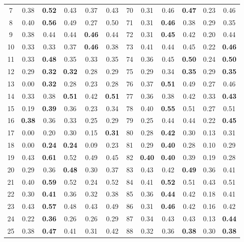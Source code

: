 \documentclass{article}
\begin{document}
{\begin{longtable}{cccccc@{\qquad}cccccc}
7 & 0.38 & \textbf{0.52} & 0.43 & 0.37 & 0.43 & 70 & 0.31 & 0.46 & \textbf{0.47} & 0.23 & 0.46 \\
8 & 0.40 & \textbf{0.56} & 0.49 & 0.27 & 0.50 & 71 & 0.31 & \textbf{0.46} & 0.38 & 0.29 & 0.35 \\
9 & 0.38 & 0.44 & 0.44 & \textbf{0.46} & 0.44 & 72 & 0.31 & \textbf{0.45} & 0.42 & 0.20 & 0.44 \\
10 & 0.33 & 0.33 & 0.37 & \textbf{0.46} & 0.38 & 73 & 0.41 & 0.44 & 0.45 & 0.22 & \textbf{0.46} \\
11 & 0.33 & \textbf{0.48} & 0.35 & 0.33 & 0.35 & 74 & 0.36 & 0.45 & \textbf{0.50} & 0.24 & \textbf{0.50} \\
12 & 0.29 & \textbf{0.32} & \textbf{0.32} & 0.28 & 0.29 & 75 & 0.29 & 0.34 & \textbf{0.35} & 0.29 & \textbf{0.35} \\
13 & 0.00 & \textbf{0.32} & 0.28 & 0.23 & 0.28 & 76 & 0.37 & \textbf{0.51} & 0.49 & 0.27 & 0.46 \\
14 & 0.33 & 0.38 & \textbf{0.51} & 0.42 & \textbf{0.51} & 77 & 0.36 & 0.38 & 0.42 & 0.33 & \textbf{0.43} \\
15 & 0.19 & \textbf{0.39} & 0.36 & 0.23 & 0.34 & 78 & 0.40 & \textbf{0.55} & 0.51 & 0.27 & 0.51 \\
16 & \textbf{0.38} & 0.36 & 0.33 & 0.25 & 0.29 & 79 & 0.25 & 0.44 & 0.44 & 0.22 & \textbf{0.45} \\
17 & 0.00 & 0.20 & 0.30 & 0.15 & \textbf{0.31} & 80 & 0.28 & \textbf{0.42} & 0.30 & 0.13 & 0.31 \\
18 & 0.00 & \textbf{0.24} & \textbf{0.24} & 0.09 & 0.23 & 81 & 0.29 & \textbf{0.40} & 0.28 & 0.10 & 0.29 \\
19 & 0.43 & \textbf{0.61} & 0.52 & 0.49 & 0.45 & 82 & \textbf{0.40} & \textbf{0.40} & 0.39 & 0.19 & 0.28 \\
20 & 0.29 & 0.36 & \textbf{0.48} & 0.30 & 0.37 & 83 & 0.43 & 0.42 & \textbf{0.49} & 0.36 & 0.41 \\
21 & 0.40 & \textbf{0.59} & 0.52 & 0.24 & 0.52 & 84 & 0.41 & \textbf{0.52} & 0.51 & 0.43 & 0.51 \\
22 & 0.30 & \textbf{0.41} & 0.36 & 0.32 & 0.38 & 85 & 0.36 & \textbf{0.44} & 0.42 & 0.18 & 0.41 \\
23 & 0.43 & \textbf{0.57} & 0.48 & 0.43 & 0.49 & 86 & 0.31 & \textbf{0.46} & 0.42 & 0.16 & 0.42 \\
24 & 0.22 & \textbf{0.36} & 0.26 & 0.26 & 0.29 & 87 & 0.34 & 0.43 & 0.43 & 0.13 & \textbf{0.44} \\
25 & 0.38 & \textbf{0.47} & 0.41 & 0.31 & 0.42 & 88 & 0.32 & 0.36 & \textbf{0.38} & 0.30 & \textbf{0.38} \\

\end{longtable}}
\end{document}
